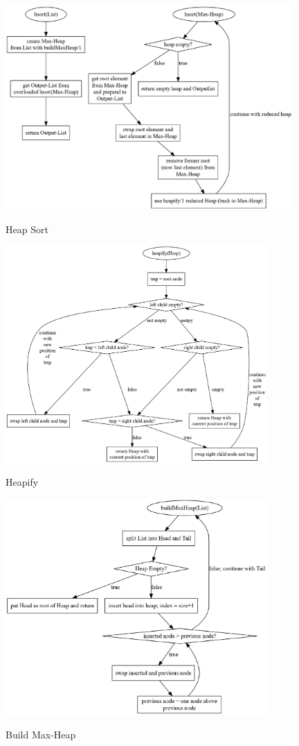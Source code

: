 \begin{figure}[hbt]
    \caption{Heap Sort}
    \centering
    \includegraphics[width = 11cm]{hsort.pdf}\label{fig:hsort}
\end{figure}

\begin{figure}[hb]
    \caption{Heapify}
    \centering
    \includegraphics[width = 10cm]{heapify.pdf}\label{fig:heapify}
\end{figure}

\begin{figure}[hbt]
    \caption{Build Max-Heap}
    \centering
    \includegraphics[width = 10cm]{buildMaxHeap.pdf}\label{fig:buildMaxHeap}
\end{figure}


